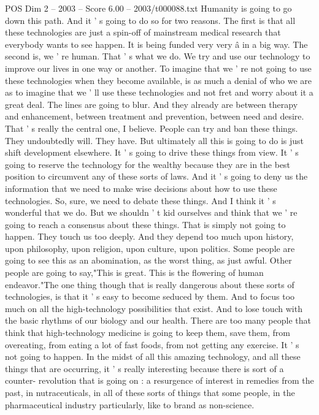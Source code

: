\begin{textsample}{POS Dim 2 – 2003 – Score 6.00 – 2003/t000088.txt}
Humanity is going to go down this path.
And it ' s going to do so for two reasons.
The first is that all these technologies are just a spin-off of mainstream medical research that everybody wants to see happen.
It is being funded very very â in a big way.
The second is, we ' re human.
That ' s what we do.
We try and use our technology to improve our lives in one way or another.
To imagine that we ' re not going to use these technologies when they become available, is as much a denial of who we are as to imagine that we ' ll use these technologies and not fret and worry about it a great deal.
The lines are going to blur.
And they already are between therapy and enhancement, between treatment and prevention, between need and desire.
That ' s really the central one, I believe.
People can try and ban these things.
They undoubtedly will.
They have.
But ultimately all this is going to do is just shift development elsewhere.
It ' s going to drive these things from view.
It ' s going to reserve the technology for the wealthy because they are in the best position to circumvent any of these sorts of laws.
And it ' s going to deny us the information that we need to make wise decisions about how to use these technologies.
So, sure, we need to debate these things.
And I think it ' s wonderful that we do.
But we shouldn ' t kid ourselves and think that we ' re going to reach a consensus about these things.
That is simply not going to happen.
They touch us too deeply.
And they depend too much upon history, upon philosophy, upon religion, upon culture, upon politics.
Some people are going to see this as an abomination, as the worst thing, as just awful.
Other people are going to say,"This is great.
This is the flowering of human endeavor."The one thing though that is really dangerous about these sorts of technologies, is that it ' s easy to become seduced by them.
And to focus too much on all the high-technology possibilities that exist.
And to lose touch with the basic rhythms of our biology and our health.
There are too many people that think that high-technology medicine is going to keep them, save them, from overeating, from eating a lot of fast foods, from not getting any exercise.
It ' s not going to happen.
In the midst of all this amazing technology, and all these things that are occurring, it ' s really interesting because there is sort of a counter- revolution that is going on : a resurgence of interest in remedies from the past, in nutraceuticals, in all of these sorts of things that some people, in the pharmaceutical industry particularly, like to brand as non-science.

\end{textsample}
